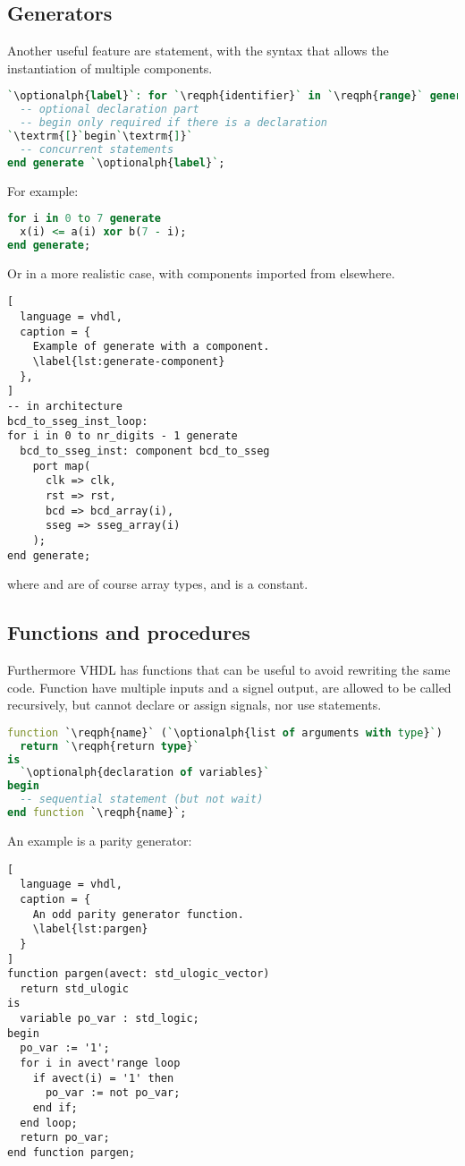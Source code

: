 \documentclass[margin=small]{tex/hsrzf}
\begin{document}
\subsection{Generators}
Another useful feature are  statement, with the syntax that allows the instantiation of multiple components.
\begin{lstlisting}[language=vhdl]
`\optionalph{label}`: for `\reqph{identifier}` in `\reqph{range}` generate
  -- optional declaration part
  -- begin only required if there is a declaration
`\textrm{[}`begin`\textrm{]}`
  -- concurrent statements
end generate `\optionalph{label}`;
\end{lstlisting}
For example:
\begin{lstlisting}[language=vhdl]
for i in 0 to 7 generate
  x(i) <= a(i) xor b(7 - i);
end generate;
\end{lstlisting}
Or in a more realistic case, with components imported from elsewhere.
\begin{lstlisting}[
  language = vhdl,
  caption = {
    Example of generate with a component.
    \label{lst:generate-component}
  },
]
-- in architecture
bcd_to_sseg_inst_loop:
for i in 0 to nr_digits - 1 generate
  bcd_to_sseg_inst: component bcd_to_sseg
    port map(
      clk => clk,
      rst => rst,
      bcd => bcd_array(i),
      sseg => sseg_array(i)
    );
end generate;
\end{lstlisting}
where  and  are of course array types, and  is a constant.

\subsection{Functions and procedures}
Furthermore VHDL has functions that can be useful to avoid rewriting the same code. Function have multiple inputs and a signel output, are allowed to be called recursively, but cannot declare or assign signals, nor use  statements.
\begin{lstlisting}[language=vhdl]
function `\reqph{name}` (`\optionalph{list of arguments with type}`)
  return `\reqph{return type}`
is
  `\optionalph{declaration of variables}`
begin
  -- sequential statement (but not wait)
end function `\reqph{name}`;
\end{lstlisting}
An example is a parity generator:
\begin{lstlisting}[
  language = vhdl,
  caption = {
    An odd parity generator function.
    \label{lst:pargen}
  }
]
function pargen(avect: std_ulogic_vector)
  return std_ulogic
is
  variable po_var : std_logic;
begin
  po_var := '1';
  for i in avect'range loop
    if avect(i) = '1' then
      po_var := not po_var;
    end if;
  end loop;
  return po_var;
end function pargen;
\end{lstlisting}
\end{document}
